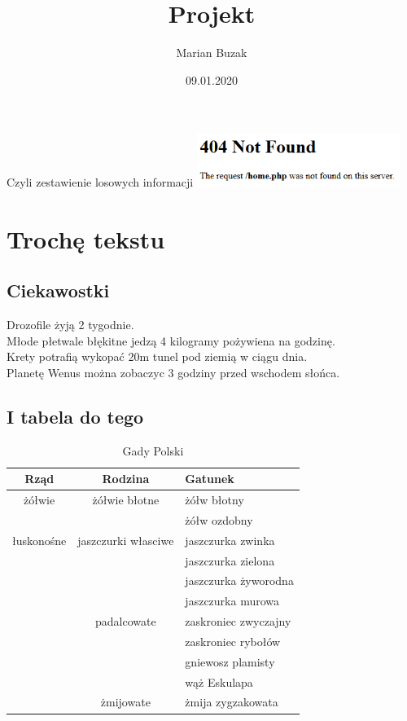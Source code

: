 \documentclass{article}
\title{Projekt}
\author{Marian Buzak}
\date{09.01.2020}
\begin{document}
\maketitle 
\pagestyle{fancy}
\fancyhead[L]{}
\begin{center}
Czyli zestawienie losowych informacji
\includegraphics[angle=15,width=250px]{404.png}
\end{center}
\newpage
\tableofcontents
\listoffigures 
\listoftables 
\newpage
\section{Trochę tekstu}
\subsection{Ciekawostki}
Drozofile żyją 2 tygodnie. \\ Młode płetwale błękitne jedzą 4 kilogramy pożywiena na godzinę. \\ Krety potrafią wykopać 20m tunel pod ziemią w ciągu dnia. \\ Planetę Wenus można zobaczyc 3 godziny przed wschodem słońca.
\subsection{I tabela do tego}
\begin{table}[h]
\caption{Gady Polski}
\begin{center}
\begin{tabular}{|c|c|l|}
\hline Rząd & Rodzina & Gatunek\\ \hline \hline
żółwie & żółwie błotne & żółw błotny\\
 &  & żółw ozdobny\\ \hline
łuskonośne & jaszczurki własciwe & jaszczurka zwinka\\
 &  & jaszczurka zielona\\
 &  & jaszczurka żyworodna\\
 &  & jaszczurka murowa\\ \cline{2-3}
 & padalcowate & zaskroniec zwyczajny\\
 & & zaskroniec rybołów\\
 & & gniewosz plamisty\\
 & & wąż Eskulapa\\ \cline{2-3}
 & żmijowate  & żmija zygzakowata\\
 
\hline
\end{tabular}
\end{center}
\end{table}
\end{document}
